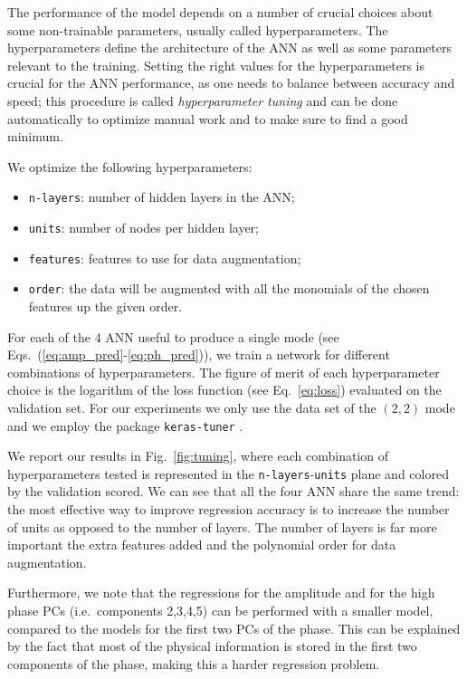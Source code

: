 \documentclass[twocolumn,showpacs,preprintnumbers,nofootinbib,prd,
superscriptaddress,10pt]{revtex4-1}
\begin{document}
The performance of the model depends on a number of crucial choices about some non-trainable parameters, usually called 
hyperparameters. The hyperparameters define the architecture of the ANN as well as some parameters relevant to the training.
Setting the right values for the hyperparameters is crucial for the ANN performance, as one needs to balance 
between accuracy and speed; this procedure is called {\it hyperparameter tuning} and can be done automatically to 
optimize manual work and to make sure to find a good minimum.

We optimize the following hyperparameters:
\begin{itemize}
	\item \texttt{n-layers}: number of hidden layers in the ANN;
	\item \texttt{units}: number of nodes per hidden layer;
	\item \texttt{features}: features to use for data augmentation;
	\item \texttt{order}: the data will be augmented with all the monomials of the chosen features up the given order.
\end{itemize}

For each of the 4 ANN useful to produce a single mode (see Eqs.~(\ref{eq:amp_pred}-\ref{eq:ph_pred})), we train a network for different combinations of hyperparameters. The figure of merit of each 
hyperparameter choice is the logarithm of the loss function (see Eq.~\eqref{eq:loss}) evaluated on the validation set.
For our experiments we only use the data set of the $(2,2)$ mode and we employ the package \texttt{keras-tuner} \cite{omalley2019kerastuner}.

We report our results in Fig.~\ref{fig:tuning}, where each combination of hyperparameters tested is represented in the \texttt{n-layers}-\texttt{units} plane and colored by the validation scored. 
We can see that all the four ANN share the same trend: the most effective way to improve regression accuracy is to increase the number of units as opposed to the number of layers.
The number of layers is far more important the extra features added and the polynomial order for data augmentation.

Furthermore, we note that the regressions for the amplitude and for the high phase PCs 
(i.e.~components 2,3,4,5) can be performed with a smaller model, compared to the models for the first two PCs of the phase. 
This can be explained by the fact that most of the physical information is stored in the first two components of the phase, making this a harder regression problem.
\end{document}
